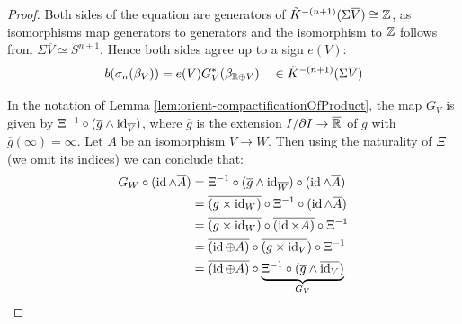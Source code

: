\begin{proof}
	Both sides of the equation are generators of $\tilde{K}^{-(n+1)}(\Sigma \overline{V}) \cong \mathbb{Z}$, as isomorphisms map generators to generators and the isomorphism to $\mathbb{Z}$ follows from $\Sigma \overline{V}\simeq S^{n+1}$. Hence both sides agree up to a sign $e(V)$:
	\begin{equation*}
		b(\sigma_n(\beta_V))=e(V) G_V^*(\beta_{\mathbb{R}\oplus V})\quad \in \tilde{K}^{-(n+1)}(\Sigma \overline{V})
	\end{equation*}

	In the notation of Lemma \ref{lem:orient-compactificationOfProduct}, the map $G_V$ is given by $ \Xi^{-1}\circ (\overline{g}\wedge \operatorname{\mathrm{id}}_{\overline{V}})$, where $\overline{g}$ is the extension $I/\partial I\to \overline{\mathbb{R}}$ of $g$ with $\overline{g}(\infty)=\infty$.
	Let $A$ be an isomorphism $V\to W$. Then using the naturality of $\Xi$ (we omit its indices) we can conclude that:
	\begin{align*}
		G_W\circ (\operatorname{\mathrm{id}} \wedge \overline{A})
		&=\Xi^{-1}\circ (\overline{g}\wedge \operatorname{\mathrm{id}}_{\overline{W}})\circ (\operatorname{\mathrm{id}} \wedge \overline{A})\\
		&=\overline{({g}\times \operatorname{\mathrm{id}}_{{W}})}\circ \Xi^{-1} \circ (\operatorname{\mathrm{id}} \wedge \overline{A})\\
		&=\overline{({g}\times \operatorname{\mathrm{id}}_{{W}})} \circ \overline{(\operatorname{\mathrm{id}} \times A)}\circ \Xi^{-1} \\
		&=\overline{(\operatorname{\mathrm{id}} \oplus A)}\circ {\overline{({g}\times \operatorname{\mathrm{id}}_V})} \circ \Xi^{-1} \\
		&=\overline{(\operatorname{\mathrm{id}} \oplus A)}\circ \underbrace{\Xi^{-1} \circ {(\overline{g}\wedge \overline{\operatorname{\mathrm{id}}_{{V}}})}  }_{G_V} 
	\end{align*}


\end{proof}
